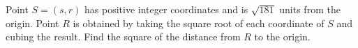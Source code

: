 Point $S=(s,r)$ has positive integer coordinates and is $\sqrt{181}$ units from the origin. Point $R$ is obtained by taking the square root of each coordinate of $S$ and cubing the result. Find the square of the distance from $R$ to the origin.

